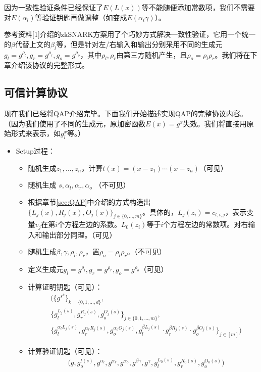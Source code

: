 \documentclass[12pt]{article}
\newcommand{\zk}{zkSNARK}
\begin{document}
因为一致性验证条件已经保证了$E(L(x))$等不能随便添加常数项，我们不需要对$E(\alpha_l)$等验证钥匙再做调整（如变成$E(\alpha_i \gamma)$）。

参考资料[1]介绍的\zk 方案用了个巧妙方式解决一致性验证，它用一个统一的$\beta$代替上文的$\beta_l$等，但是针对左/右输入和输出分别采用不同的生成元$g_l=g^{\rho_l},g_r=g^{\rho_r},g_o=g^{\rho_o}$，其中$\rho_l,\rho_r$由第三方随机产生，且$\rho_o=\rho_l\rho_r$。我们将在下章介绍该协议的完整形式。
\subsection{可信计算协议}
现在我们已经将QAP介绍完毕。下面我们开始描述实现QAP的完整协议内容。
（因为我们使用了不同的生成元，原加密函数$E(x)=g^x$失效。我们将直接用原始形式来表示，如$g_l^x$等。）
\begin{itemize}
	\item Setup过程：
	\begin{itemize}
		\item 随机生成$z_1,...,z_n$，计算$t(x)=(x-z_1)\cdots(x-z_n)$（可见）
		\item 随机生成 $s,\alpha_l,\alpha_r,\alpha_o$ （不可见）
		\item 根据章节\ref{sec:QAP}中介绍的方式构造出$\{L_j(x),R_j(x),O_j(x)\}_{j \in \{0,...,m\}}$。具体的，$L_j(z_i)=c_{l,i,j}$，表示变量$v_j$在第$i$个方程左边的系数。$L_0(z_i)$等于$i$个方程左边的常数项。对右输入和输出部分同理。（可见）
		\item 随机生成$\beta,\gamma,\rho_l,\rho_r$，置$\rho_o=\rho_l\rho_r$。（不可见）
		\item 定义生成元$g_l = g^{\rho_l},g_r = g^{\rho_r},g_o= g^{\rho_o}$（可见）
         \item 计算证明钥匙（可见）：
		\begin{align*}
		&\big( \{g^{s^k}\}_{k=\{0,1,...,d\}}, \\
		& \{g_l^{L_j(s)},g_r^{R_j(s)},g_o^{O_j(s)}\}_{j \in \{0,1,...,m\}},\\
		& \{g_l^{\alpha_l L_j(s)}, g_r^{\alpha_r R_j(s)},g_o^{\alpha_o O_j(s)},g_l^{\beta L_j(s)}\cdot g_r^{\beta R_j(s)}\cdot g_o^{\beta O_j(s)} \}_{j \in [m]} \big)
		\end{align*}
	    \item 计算验证钥匙（可见）：
	    \begin{align*}
		 &\big(g,g_o^{t(s)},g^{\alpha_l},g^{\alpha_r},g^{\alpha_o},g^{\beta\gamma},g^{\gamma},g_l^{L_0(s)},  g_r^{R_0(s)},  g_o^{O_0(s)}\big)
		\end{align*}
	\end{itemize}

\end{itemize}
\end{document}
